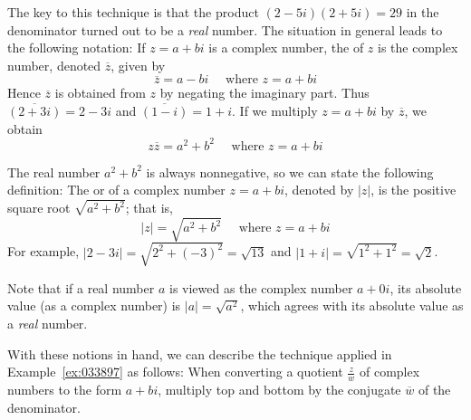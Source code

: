 \documentclass{ximera}
\begin{document}
The key to this technique is that the product $(2 - 5i)(2 + 5i) = 29$ in the denominator turned out to be a \textit{real} number. The situation in general leads to the following notation: If $z = a + bi$ is a complex number, the  of $z$ is the complex number, denoted $\overline{z}$, given by
\begin{equation*}
\overline{z} = a-bi \quad \mbox{ where } z = a+bi
\end{equation*}
Hence $\overline{z}$ is obtained from $z$ by negating the imaginary part. Thus $\overline{(2+3i)} = 2-3i$ and  $\overline{(1-i)} = 1+i$. If we multiply $z = a + bi$ by $\overline{z}$, we obtain
\begin{equation*}
z \overline{z} = a^2 + b^2 \quad \mbox{ where } z = a+bi
\end{equation*}

The real number $a^{2} + b^{2}$ is always nonnegative, so we can state the following definition: The  or  of a complex number $z = a + bi$, denoted by $|z|$, is the positive square root $\sqrt{a^2 + b^2}$; that is,
\begin{equation*}
|z| = \sqrt{a^2 + b^2} \quad \mbox{ where } z = a+bi
\end{equation*}
For example, $| 2-3i| = \sqrt{2^2 + (-3)^2} = \sqrt{13}$
 and $| 1+i| = \sqrt{1^2 + 1^2} = \sqrt{2}$.

Note that if a real number $a$ is viewed as the complex number $a + 0i$, its absolute value (as a complex number) is $|a| = \sqrt{a^2}$, which agrees with its absolute value as a \textit{real} number.

With these notions in hand, we can describe the technique applied in Example~\ref{ex:033897}  as follows: When converting a quotient $\frac{z}{w}$
 of complex numbers to the form $a + bi$, multiply top and bottom by the conjugate  $\overline{w}$ of the denominator.
\end{document}
